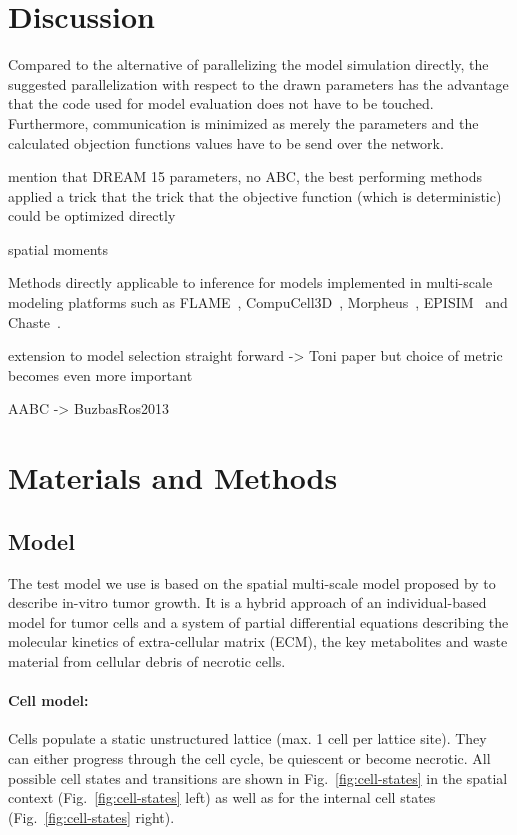 \documentclass[10pt,letterpaper]{article}
\begin{document}
\section*{Discussion}

Compared to the alternative of parallelizing the model simulation directly, the suggested parallelization with respect to the drawn parameters has the advantage that the code used for model evaluation does not have to be touched. Furthermore, communication is minimized as merely the parameters and the calculated objection functions values have to be send over the network.

mention that DREAM 15 parameters, no ABC, the best performing methods applied a trick that the trick that the objective function (which is deterministic) could be optimized directly

spatial moments

Methods directly applicable to inference for models implemented in multi-scale modeling platforms such as FLAME~\cite{RichmondWal2010}, CompuCell3D~\cite{SwatTho2012}, Morpheus~\cite{StarrussBac2014}, EPISIM~\cite{SutterlinKol2013} and Chaste~\cite{MiramsArt2013}.

extension to model selection straight forward -> Toni paper
but choice of metric becomes even more important

AABC -> BuzbasRos2013




\section*{Materials and Methods}
\subsection*{Model}
The test model we use is based on the spatial multi-scale model proposed by \cite{Jagiella2015} to describe in-vitro tumor growth. It is a hybrid approach of an individual-based model for tumor cells and a system of partial differential equations describing the molecular kinetics of extra-cellular matrix (ECM), the key metabolites and waste material from cellular debris of necrotic cells. 

\paragraph{Cell model:} Cells populate a static unstructured lattice (max. 1 cell per lattice site). They can either progress through the cell cycle, be quiescent or become necrotic. All possible cell states and transitions are shown in Fig.~\ref{fig:cell-states} in the spatial context (Fig.~\ref{fig:cell-states} left) as well as for the internal cell states (Fig.~\ref{fig:cell-states} right). 
\end{document}

